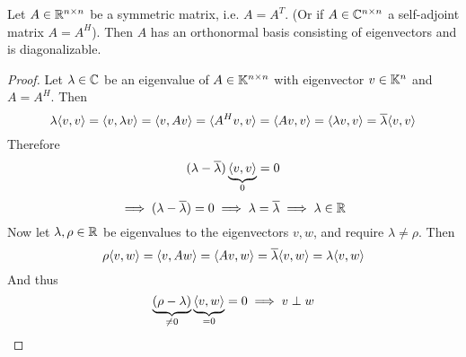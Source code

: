 \documentclass[../../script.tex]{subfiles}
\begin{document}
\begin{thm}
    Let $A \in \mathbb{R}^{n \times n}$ be a symmetric matrix, i.e. $A = A^T$. (Or if $A \in \mathbb{C}^{n \times n}$ a self-adjoint matrix $A = A^H$).
    Then $A$ has an orthonormal basis consisting of eigenvectors and is diagonalizable.
\end{thm}
\begin{proof}
    Let $\lambda \in \mathbb{C}$ be an eigenvalue of $A \in \mathbb{K}^{n \times n}$ with eigenvector $v \in \mathbb{K}^n$ and $A = A^H$. Then 
    \begin{equation}
        \lambda\langle v,v\rangle = \langle v,\lambda v\rangle = \langle v,Av\rangle = \langle A^Hv,v\rangle = \langle Av,v\rangle = \langle\lambda v,v\rangle = \overline{\lambda} \langle v,v\rangle
    \end{equation}
    Therefore
    \begin{equation}
        (\lambda - \overline{\lambda})\underbrace{\langle v,v\rangle}_0 = 0
    \end{equation}
    \begin{equation}
        \implies (\lambda - \overline{\lambda}) = 0 \implies \lambda = \overline{\lambda} \implies \lambda \in \mathbb{R}
    \end{equation}
    Now let $\lambda, \rho \in \mathbb{R}$ be eigenvalues to the eigenvectors $v, w$, and require $\lambda \ne \rho$. Then 
    \begin{equation}
        \rho\langle v,w\rangle = \langle v,Aw\rangle = \langle Av,w\rangle = \overline{\lambda}\langle v,w\rangle = \lambda\langle v,w\rangle
    \end{equation}
    And thus 
    \begin{equation}
        \underbrace{(\rho - \lambda)}_{\ne 0} \underbrace{\langle v,w\rangle}_{=0} = 0 \implies v \perp w
    \end{equation}
\end{proof}
\end{document}
